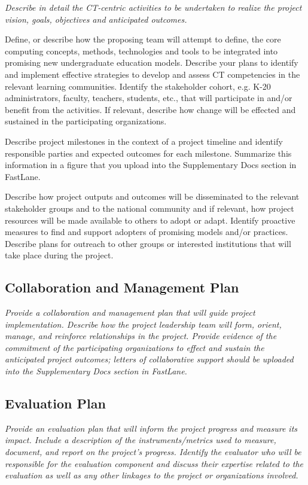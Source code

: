 {\em Describe in detail the CT-centric activities to be undertaken to realize the project vision, goals, objectives and anticipated outcomes. 

Define, or describe how the proposing team will attempt to define, the core computing concepts, methods, technologies and tools to be integrated into promising new undergraduate education models.  Describe your plans to identify and implement effective strategies to develop and assess CT competencies in the relevant learning communities.  Identify the stakeholder cohort, e.g. K-20 administrators, faculty, teachers, students, etc., that will participate in and/or benefit from the activities. If relevant, describe how change will be effected and sustained in the participating organizations.  

Describe project milestones in the context of a project timeline and identify responsible parties and expected outcomes for each milestone.  Summarize this information in a figure that you upload into the Supplementary Docs section in FastLane. 

Describe how project outputs and outcomes will be disseminated to the relevant stakeholder groups and to the national community and if relevant, how project resources will be made available to others to adopt or adapt. Identify proactive measures to find and support adopters of promising models and/or practices. Describe plans for outreach to other groups or interested institutions that will take place during the project.  
}

\subsection*{Collaboration and Management Plan}

{\em Provide a collaboration and management plan that will guide project implementation.  Describe how the project leadership team will form, orient, manage, and reinforce relationships in the project.  Provide evidence of the commitment of the participating organizations to effect and sustain the anticipated project outcomes; letters of collaborative support should be uploaded into the Supplementary Docs section in FastLane. }

\subsection*{Evaluation Plan}

{\em Provide an evaluation plan that will inform the project progress and measure its impact.  Include a description of the instruments/metrics used to measure, document, and report on the project's progress.  Identify the evaluator who will be responsible for the evaluation component and discuss their expertise related to the evaluation as well as any other linkages to the project or organizations involved.  }



